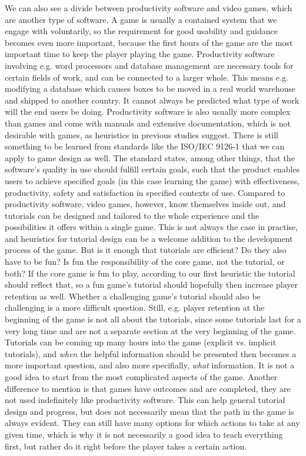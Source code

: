 We can also see a divide between productivity software and video games, which are another type of software. A game is usually a contained system that we engage with voluntarily, so the requirement for good usability and guidance becomes even more important, because the first hours of the game are the most important time to keep the player playing the game. Productivity software involving e.g. word processors and database management are necessary tools for certain fields of work, and can be connected to a larger whole. This means e.g. modifying a database which causes boxes to be moved in a real world warehouse and shipped to another country. It cannot always be predicted what type of work will the end users be doing. Productivity software is also usually more complex than games and come with manuals and extensive documentation, which is not desirable with games, as heuristics in previous studies suggest. There is still something to be learned from standards like the ISO/IEC 9126-1 that we can apply to game design as well. The standard states, among other things, that the software's quality in use should fulfill certain goals, such that the product enables users to achieve specified goals (in this case learning the game) with effectiveness, productivity, safety and satisfaction in specified contexts of use. Compared to productivity software, video games, however, know themselves inside out, and tutorials can be designed and tailored to the whole experience and the possibilities it offers within a single game. This is not always the case in practise, and heuristics for tutorial design can be a welcome addition to the development process of the game. But is it enough that tutorials are efficient? Do they also have to be fun? Is fun the responsibility of the core game, not the tutorial, or both? If the core game is fun to play, according to our first heuristic the tutorial should reflect that, so a fun game's tutorial should hopefully then increase player retention as well. Whether a challenging game's tutorial should also be challenging is a more difficult question. Still, e.g. player retention at the beginning of the game is not all about the tutorials, since some tutorials last for a very long time and are not a separate section at the very beginning of the game. Tutorials can be coming up many hours into the game (explicit vs. implicit tutorials), and \textit{when} the helpful information should be presented then becomes a more important question, and also more specifially, \textit{what} information. It is not a good idea to start from the most complicated aspects of the game. Another difference to mention is that games have outcomes and are completed, they are not used indefinitely like productivity software. This can help general tutorial design and progress, but does not necessarily mean that the path in the game is always evident. They can still have many options for which actions to take at any given time, which is why it is not necessarily a good idea to teach everything first, but rather do it right before the player takes a certain action.

